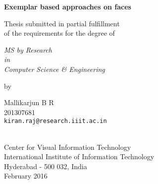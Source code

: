 \thispagestyle{empty}
\begin{center}
\vspace*{1.5cm}
{\Large \bf Exemplar based approaches on faces}

\vspace*{3.75cm}
{\large Thesis submitted in partial fulfillment\\}
{\large  of the requirements for the degree of \\}

\vspace*{1cm}
{\it {\large MS by Research} \\
{\large in\\}
{\large Computer Science \& Engineering \\}}

\vspace*{1cm}
{\large by}

\vspace*{5mm}
{\large Mallikarjun B R\\}
{\large 201307681\\
{\small \tt kiran.raj@research.iiit.ac.in}}


\vspace*{4.0cm}
{\\}
{\large Center for Visual Information Technology \\}
{\large International Institute of Information Technology\\}
{\large Hyderabad - 500 032, India\\}
{\large February 2016\\}
\end{center}
